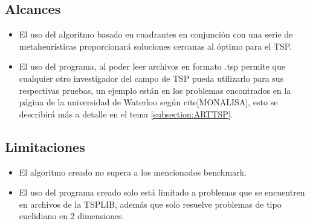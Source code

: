 \subsection {Alcances}   
      \begin{itemize} 
		  \item El uso del algoritmo basado en cuadrantes en conjunción con una serie de metaheurísticas proporcionará soluciones cercanas al óptimo para el TSP.
		  \item El uso del programa, al poder leer archivos en formato .tsp permite que cualquier otro investigador del campo de TSP pueda utilizarlo para sus respectivas pruebas, un ejemplo están en los problemas encontrados en la página de la universidad de Waterloo según cite{[MONALISA]}, esto se describirá más a detalle en el tema \ref{subsection:ARTTSP}.
      \end{itemize}
        
\subsection {Limitaciones}
       \begin{itemize} 
		  \item El algoritmo creado no supera a los mencionados benchmark.
		  \item El uso del programa creado solo está limitado a problemas que se encuentren en archivos de la TSPLIB, además que solo resuelve problemas de tipo euclidiano en 2 dimensiones.
      \end{itemize}
      